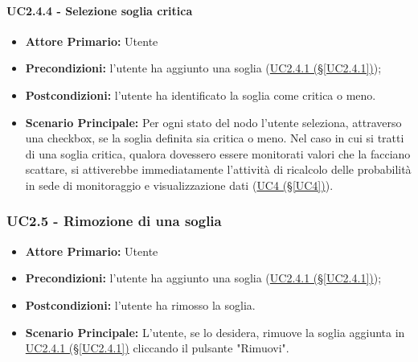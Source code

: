 \paragraph{UC2.4.4 - Selezione soglia critica}\label{UC2.4.4}
\begin{itemize}
	\item \textbf{Attore Primario:} Utente
	\item \textbf{Precondizioni:} l'utente ha aggiunto una soglia (\hyperref[UC2.4.1]{UC2.4.1 (§\ref*{UC2.4.1})});
	\item \textbf{Postcondizioni:} l'utente ha identificato la soglia come critica o meno.
	\item \textbf{Scenario Principale:} Per ogni stato del nodo l'utente seleziona, attraverso una checkbox, se la soglia definita sia critica o meno. Nel caso in cui si tratti di una soglia critica, qualora dovessero essere monitorati valori che la facciano scattare, si attiverebbe immediatamente l'attività di ricalcolo delle probabilità in sede di monitoraggio e visualizzazione dati (\hyperref[UC4]{UC4 (§\ref*{UC4})}).
\end{itemize}

\pagebreak

\subsubsection{UC2.5 - Rimozione di una soglia}\label{UC2.5}
\begin{itemize}
	\item \textbf{Attore Primario:} Utente
	\item \textbf{Precondizioni:} l'utente ha aggiunto una soglia (\hyperref[UC2.4.1]{UC2.4.1 (§\ref*{UC2.4.1})});
	\item \textbf{Postcondizioni:} l'utente ha rimosso la soglia.
	\item \textbf{Scenario Principale:} L'utente, se lo desidera, rimuove la soglia aggiunta in \hyperref[UC2.4.1]{UC2.4.1 (§\ref*{UC2.4.1})} cliccando il pulsante "Rimuovi".
\end{itemize}

